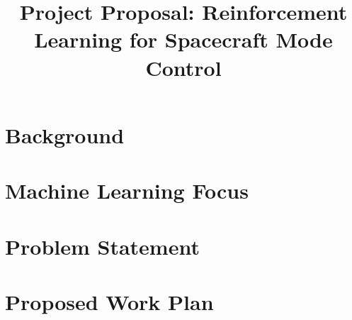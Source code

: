 \documentclass[]{article}
\title{Project Proposal: Reinforcement Learning for Spacecraft Mode Control}
\author{}
\begin{document}
\maketitle

\begin{abstract}

\end{abstract}

\section{Background}

\section{Machine Learning Focus}

\section{Problem Statement}

\section{Proposed Work Plan}
\end{document}
